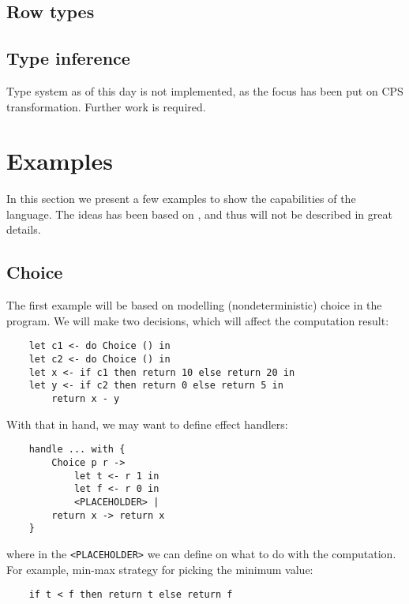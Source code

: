 \documentclass{article}
\theoremstyle{definition}
\theoremstyle{lemma}
\theoremstyle{observation}
\theoremstyle{theorem}
\begin{document}
    \subsection{Row types}

    \subsection{Type inference}

    Type system as of this day is not implemented, as the focus has been put
    on CPS transformation. Further work is required.

\section{Examples}

    In this section we present a few examples to show the capabilities of the
    language. The ideas has been based on \cite{eff}, and thus will not be
    described in great details.

    \subsection{Choice}
    \label{sec:choice-example}

    The first example will be based on modelling (nondeterministic) choice
    in the program. We will make two decisions, which will affect the computation
    result:

    \begin{verbatim}
    let c1 <- do Choice () in
    let c2 <- do Choice () in
    let x <- if c1 then return 10 else return 20 in
    let y <- if c2 then return 0 else return 5 in
        return x - y
    \end{verbatim}

    With that in hand, we may want to define effect handlers:

    \begin{verbatim}
    handle ... with {
        Choice p r ->
            let t <- r 1 in
            let f <- r 0 in
            <PLACEHOLDER> |
        return x -> return x
    }
    \end{verbatim}

    where in the \verb!<PLACEHOLDER>! we can define on what to do with the
    computation. For example, min-max strategy for picking the minimum value:

    \begin{verbatim}
    if t < f then return t else return f
    \end{verbatim}
\end{document}

